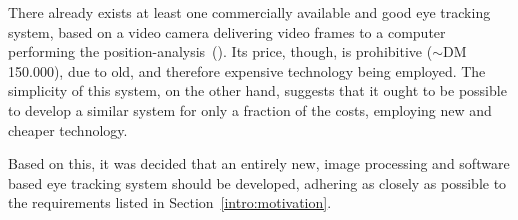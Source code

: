 There already exists at least one commercially available and good eye
tracking system, based on a video camera delivering video frames to a
computer performing the position-analysis~(\cite{antrag}).  Its price,
though, is prohibitive ($\sim$DM 150.000), due to old, and therefore
expensive technology being employed.  The simplicity of this system,
on the other hand, suggests that it ought to be possible to develop a
similar system for only a fraction of the costs, employing new and
cheaper technology.

Based on this, it was decided that an entirely new, image processing
and software based eye tracking system should be developed, adhering
as closely as possible to the requirements listed in
Section~\ref{intro:motivation}. 